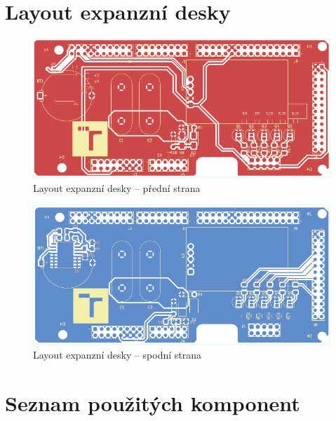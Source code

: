 \chapter{Layout expanzní desky}

\begin{figure}[H]
    \centering
    \includegraphics[width=0.67\textheight, angle=90]{obrazky-figures/extension_shield-brd-front.pdf}
    \caption{Layout expanzní desky -- přední strana}
    \label{fig:layout-front-big}
\end{figure}

\begin{figure}[H]
    \centering
    \includegraphics[width=0.67\textheight, angle=90]{obrazky-figures/extension_shield-brd-back.pdf}
    \caption{Layout expanzní desky -- spodní strana}
    \label{fig:layout-back-big}
\end{figure}

\chapter{Seznam použitých komponent}


